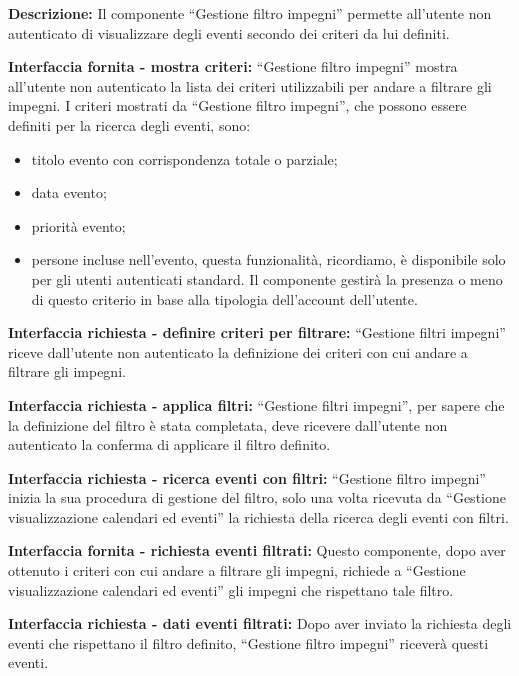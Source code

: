 \begin{listaPersonale}[DCI]{}

    \textbf{Descrizione:} Il componente “Gestione filtro impegni” permette all'utente non autenticato di visualizzare degli eventi secondo dei criteri da lui definiti.

    \textbf{Interfaccia fornita - mostra criteri:} “Gestione filtro impegni” mostra all'utente non autenticato la lista dei criteri utilizzabili per andare a filtrare gli impegni.
    I criteri mostrati da “Gestione filtro impegni”, che possono essere definiti per la ricerca degli eventi, sono:
    \begin{itemize}
        \item titolo evento con corrispondenza totale o parziale;
        \item data evento;
        \item priorità evento;
        \item persone incluse nell'evento, questa funzionalità, ricordiamo, è disponibile solo per gli utenti autenticati standard. Il componente gestirà la presenza o meno di questo criterio in base alla tipologia dell'account dell'utente.
    \end{itemize}

    \textbf{Interfaccia richiesta - definire criteri per filtrare:} “Gestione filtri impegni” riceve dall'utente non autenticato la definizione dei criteri con cui andare a filtrare gli impegni.

    \textbf{Interfaccia richiesta - applica filtri:} “Gestione filtri impegni”, per sapere che la definizione del filtro è stata completata, deve ricevere dall'utente non autenticato la conferma di applicare il filtro definito.

    \textbf{Interfaccia richiesta - ricerca eventi con filtri:} “Gestione filtro impegni” inizia la sua procedura di gestione del filtro, solo una volta ricevuta da “Gestione visualizzazione calendari ed eventi” la richiesta della ricerca degli eventi con filtri.

    \textbf{Interfaccia fornita - richiesta eventi filtrati:} Questo componente, dopo aver ottenuto i criteri con cui andare a filtrare gli impegni, richiede a “Gestione visualizzazione calendari ed eventi” gli impegni che rispettano tale filtro.

    \textbf{Interfaccia richiesta - dati eventi filtrati:} Dopo aver inviato la richiesta degli eventi che rispettano il filtro definito, “Gestione filtro impegni” riceverà questi eventi.


\end{listaPersonale}
